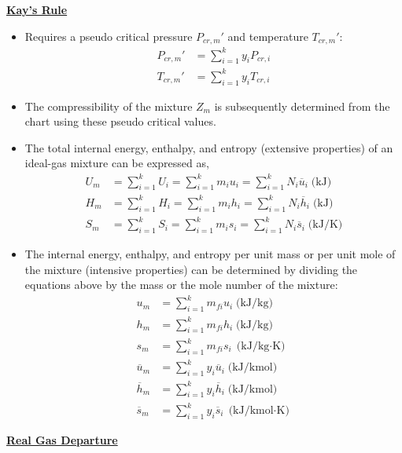 \Large \textbf{{\color{red}\underline{Kay's Rule}}}

\begin{itemize}
    \item Requires a pseudo critical pressure {\color{blue}$P_{cr,m}'$} and temperature {\color{blue}$T_{cr,m}'$}:
    \begin{align*}
        P_{cr,m}' &= \sum_{i=1}^{k} y_i P_{cr,i} \\
        T_{cr,m}' &= \sum_{i=1}^{k} y_i T_{cr,i}
    \end{align*}
    \item The compressibility of the mixture {\color{blue}$Z_m$} is subsequently determined {\color{blue}from the chart} using these {\color{blue}pseudo critical values.}
    \item The {\color{blue}total internal energy, enthalpy, and entropy} (extensive properties) of an ideal-gas mixture can be expressed as,
    \begin{align*}
        U_m &= \sum_{i=1}^{k} U_i = \sum_{i=1}^k m_i u_i = \sum_{i=1}^k N_i \overline{u}_i \; \text{(kJ)} \\
        H_m &= \sum_{i=1}^k H_i = \sum_{i=1}^k m_i h_i = \sum_{i=1}^k N_i \overline{h}_i \; \text{(kJ)}\\
        S_m &= \sum_{i=1}^k S_i = \sum_{i=1}^k m_i s_i = \sum_{i=1}^k N_i \overline{s}_i \; \text{(kJ/K)}
    \end{align*}
    \item The {\color{blue}internal energy, enthalpy, and entropy per unit mass or per unit mole of the mixture} (intensive properties) can be determined by dividing the equations above by the mass or the mole number of the mixture:
    \begin{align*}
        u_m &= \sum_{i=1}^k m_{fi} u_i \; \text{(kJ/kg)} \\
        h_m &= \sum_{i=1}^k m_{fi} h_i \; \text{(kJ/kg)}\\
        s_m &= \sum_{i=1}^k m_{fi} s_i \; \text{(kJ/kg$\cdot$K)}\\
        \overline{u}_m &= \sum_{i=1}^k y_i \overline{u}_i \; \text{(kJ/kmol)} \\
        \overline{h}_m &= \sum_{i=1}^k y_i \overline{h}_i \; \text{(kJ/kmol)}\\
        \overline{s}_m &= \sum_{i=1}^k y_i \overline{s}_i \; \text{(kJ/kmol$\cdot$K)}
    \end{align*}
\end{itemize}

\Large \textbf{{\color{red}\underline{Real Gas Departure}}}

